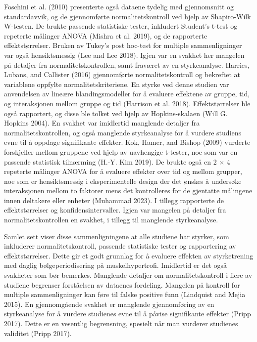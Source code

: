 \documentclass[
  letterpaper,
  DIV=11,
  numbers=noendperiod]{scrreprt}
\begin{document}
Foschini et al. (2010) presenterte også dataene tydelig med gjennomsnitt
og standardavvik, og de gjennomførte normalitetskontroll ved hjelp av
Shapiro-Wilk W-testen. De brukte passende statistiske tester, inkludert
Student's t-test og repeterte målinger ANOVA (Mishra et al. 2019), og de
rapporterte effektstørrelser. Bruken av Tukey's post hoc-test for
multiple sammenligninger var også hensiktsmessig (Lee and Lee 2018).
Igjen var en svakhet her mangelen på detaljer fra normalitetskontrollen,
samt fraværet av en styrkeanalyse. Harries, Lubans, and Callister (2016)
gjennomførte normalitetskontroll og bekreftet at variablene oppfylte
normalitetskriteriene. En styrke ved denne studien var anvendelsen av
lineære blandingsmodeller for å evaluere effektene av gruppe, tid, og
interaksjonen mellom gruppe og tid (Harrison et al. 2018).
Effektstørrelser ble også rapportert, og disse ble tolket ved hjelp av
Hopkins-skalaen (Will G. Hopkins 2004). En svakhet var imidlertid
manglende detaljer fra normalitetskontrollen, og også manglende
styrkeanalyse for å vurdere studiens evne til å oppdage signifikante
effekter. Kok, Hamer, and Bishop (2009) vurderte forskjeller mellom
gruppene ved hjelp av uavhengige t-tester, noe som var en passende
statistisk tilnærming (H.-Y. Kim 2019). De brukte også en 2 × 4
repeterte målinger ANOVA for å evaluere effekter over tid og mellom
grupper, noe som er hensiktsmessig i eksperimentelle design der det
ønskes å undersøke interaksjonen mellom to faktorer mens det
kontrolleres for de gjentatte målingene innen deltakere eller enheter
(Muhammad 2023). I tillegg rapporterte de effektstørrelser og
konfidensintervaller. Igjen var mangelen på detaljer fra
normalitetskontrollen en svakhet, i tillegg til manglende styrkeanalyse.

Samlet sett viser disse sammenligningene at alle studiene har styrker,
som inkluderer normalitetskontroll, passende statistiske tester og
rapportering av effektstørrelser. Dette gir et godt grunnlag for å
evaluere effekten av styrketrening med daglig bølgeperiodisering på
muskelhypertrofi. Imidlertid er det også svakheter som bør bemerkes.
Manglende detaljer om normalitetskontroll i flere av studiene begrenser
forståelsen av dataenes fordeling. Mangelen på kontroll for multiple
sammenligninger kan føre til falske positive funn (Lindquist and Mejia
2015). En gjennomgående svakhet er manglende gjennomføring av en
styrkeanalyse for å vurdere studienes evne til å påvise signifikante
effekter (Pripp 2017). Dette er en vesentlig begrensning, spesielt når
man vurderer studienes validitet (Pripp 2017).
\end{document}
